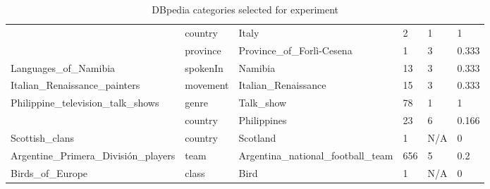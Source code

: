 \begin{table}[]
{\begin{tabular}{llllll}
\multicolumn{1}{|l|}{} & \multicolumn{1}{l|}{country} & \multicolumn{1}{l|}{Italy} & \multicolumn{1}{l|}{2} & \multicolumn{1}{l|}{1} & \multicolumn{1}{l|}{1} \\ \cline{2-6} 
\multicolumn{1}{|l|}{} & \multicolumn{1}{l|}{province} & \multicolumn{1}{l|}{Province\_of\_Forlì-Cesena} & \multicolumn{1}{l|}{1} & \multicolumn{1}{l|}{3} & \multicolumn{1}{l|}{0.333} \\ \hline
\multicolumn{1}{|l|}{Languages\_of\_Namibia} & \multicolumn{1}{l|}{spokenIn} & \multicolumn{1}{l|}{Namibia} & \multicolumn{1}{l|}{13} & \multicolumn{1}{l|}{3} & \multicolumn{1}{l|}{0.333} \\ \hline
\multicolumn{1}{|l|}{Italian\_Renaissance\_painters} & \multicolumn{1}{l|}{movement} & \multicolumn{1}{l|}{Italian\_Renaissance} & \multicolumn{1}{l|}{15} & \multicolumn{1}{l|}{3} & \multicolumn{1}{l|}{0.333} \\ \hline
\multicolumn{1}{|l|}{\multirow{2}{*}{Philippine\_television\_talk\_shows}} & \multicolumn{1}{l|}{genre} & \multicolumn{1}{l|}{Talk\_show} & \multicolumn{1}{l|}{78} & \multicolumn{1}{l|}{1} & \multicolumn{1}{l|}{1} \\ \cline{2-6} 
\multicolumn{1}{|l|}{} & \multicolumn{1}{l|}{country} & \multicolumn{1}{l|}{Philippines} & \multicolumn{1}{l|}{23} & \multicolumn{1}{l|}{6} & \multicolumn{1}{l|}{0.166} \\ \hline
\multicolumn{1}{|l|}{Scottish\_clans} & \multicolumn{1}{l|}{country} & \multicolumn{1}{l|}{Scotland} & \multicolumn{1}{l|}{1} & \multicolumn{1}{l|}{N/A} & \multicolumn{1}{l|}{0} \\ \hline
\multicolumn{1}{|l|}{Argentine\_Primera\_División\_players} & \multicolumn{1}{l|}{team} & \multicolumn{1}{l|}{Argentina\_national\_football\_team} & \multicolumn{1}{l|}{656} & \multicolumn{1}{l|}{5} & \multicolumn{1}{l|}{0.2} \\ \hline
Birds\_of\_Europe & class & Bird & 1 & N/A & 0 \\ \hline
\end{tabular}%
}
\caption{DBpedia categories selected for experiment}
\label{tab:dbpedia_categories}
\end{table}